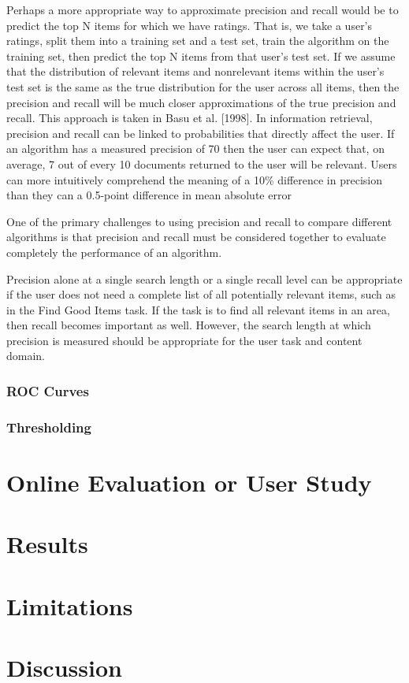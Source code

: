 Perhaps a more appropriate way to approximate precision and recall would
be to predict the top N items for which we have ratings. That is, we take a
user’s ratings, split them into a training set and a test set, train the algorithm
on the training set, then predict the top N items from that user’s test set. If we
assume that the distribution of relevant items and nonrelevant items within
the user’s test set is the same as the true distribution for the user across all
items, then the precision and recall will be much closer approximations of the
true precision and recall. This approach is taken in Basu et al. [1998].
In information retrieval, precision and recall can be linked to probabilities
that directly affect the user. If an algorithm has a measured precision of 70%
then the user can expect that, on average, 7 out of every 10 documents returned
to the user will be relevant. Users can more intuitively comprehend the meaning
of a 10\% difference in precision than they can a 0.5-point difference in mean
absolute error

One of the primary challenges to using precision and recall to compare different
algorithms is that precision and recall must be considered together to
evaluate completely the performance of an algorithm.

Precision alone at a single search length or a single recall level can be appropriate
if the user does not need a complete list of all potentially relevant
items, such as in the Find Good Items task. If the task is to find all relevant
items in an area, then recall becomes important as well. However, the search
length at which precision is measured should be appropriate for the user task
and content domain.


\subsubsection{ROC Curves}

\subsubsection{Thresholding}

\section{Online Evaluation or User Study}

\section{Results}

\section{Limitations}

\section{Discussion}





